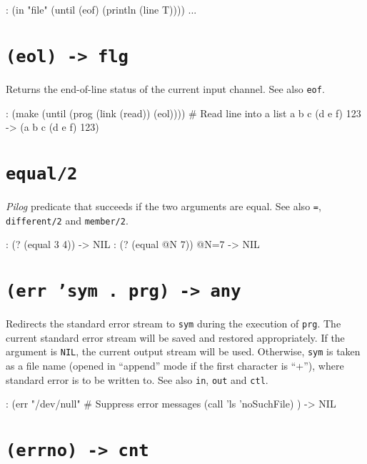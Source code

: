 \begin{wideverbatim}
: (in "file" (until (eof) (println (line T))))
...
\end{wideverbatim}

 
\section*{\texttt{(eol) -> flg}}
\label{sec:func-ref-E-(eol) -> flg}


Returns the end-of-line status of the current input channel. See also
\texttt{eof}.


\begin{wideverbatim}
: (make (until (prog (link (read)) (eol))))  # Read line into a list
a b c (d e f) 123
-> (a b c (d e f) 123)
\end{wideverbatim}

 
\section*{\texttt{equal/2}}
\label{sec:func-ref-E-equal/2}


\emph{Pilog} predicate that succeeds if the two
arguments are equal. See also \texttt{=}, \texttt{different/2} and
\texttt{member/2}.


\begin{wideverbatim}
: (? (equal 3 4))
-> NIL
: (? (equal @N 7))
 @N=7
-> NIL
\end{wideverbatim}

 
\section*{\texttt{(err 'sym . prg) -> any}}
\label{sec:func-ref-E-(err 'sym . prg) -> any}


Redirects the standard error stream to \texttt{sym} during the execution of
\texttt{prg}. The current standard error stream will be saved and restored
appropriately. If the argument is \texttt{NIL}, the current output stream will
be used. Otherwise, \texttt{sym} is taken as a file name (opened in ``append''
mode if the first character is ``+''), where standard error is to be
written to. See also \texttt{in}, \texttt{out} and \texttt{ctl}.


\begin{wideverbatim}
: (err "/dev/null"             # Suppress error messages
   (call 'ls 'noSuchFile) )
-> NIL
\end{wideverbatim}

 
\section*{\texttt{(errno) -> cnt}}
\label{sec:func-ref-E-(errno) -> cnt}


